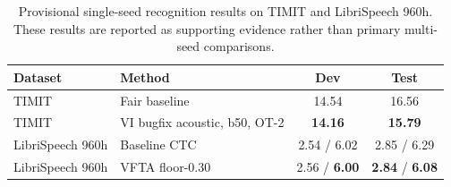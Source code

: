 \begin{table}[t]
  \centering
  \small
  \caption{Provisional single-seed recognition results on TIMIT and
  LibriSpeech 960h. These results are reported as supporting evidence
  rather than primary multi-seed comparisons.}
  \label{tab:single_seed_scale}
  \begin{tabular}{llcc}
    \toprule
    Dataset & Method & Dev & Test \\
    \midrule
    TIMIT
      & Fair baseline
      & 14.54 & 16.56 \\
    TIMIT
      & VI bugfix acoustic, b50, OT-2
      & \textbf{14.16} & \textbf{15.79} \\
    \midrule
    LibriSpeech 960h
      & Baseline CTC
      & 2.54 / 6.02 & 2.85 / 6.29 \\
    LibriSpeech 960h
      & VFTA floor-0.30
      & 2.56 / \textbf{6.00} & \textbf{2.84} / \textbf{6.08} \\
    \bottomrule
  \end{tabular}
\end{table}
